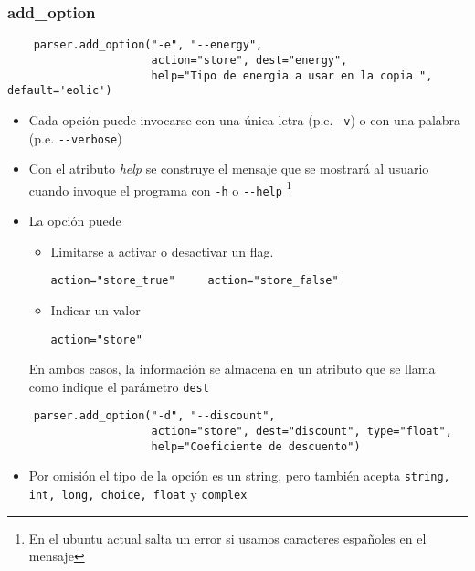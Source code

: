 \documentclass[ucs]{beamer}
\begin{document}
\begin{frame}[fragile]
\frametitle{add\_option}

  \begin{tiny}
  \begin{verbatim}
    parser.add_option("-e", "--energy", 
                      action="store", dest="energy",
                      help="Tipo de energia a usar en la copia ", default='eolic')
  \end{verbatim}
  \end{tiny}

\begin{itemize}
\item
Cada opción puede invocarse con una única letra (p.e. \verb|-v|) 
o con una palabra (p.e. \verb|--verbose|)
\item
Con el atributo \emph{help} se construye  el mensaje que
se mostrará al usuario cuando invoque el programa con  \verb|-h| o \verb|--help|
\footnote{En el ubuntu actual salta un error si usamos caracteres españoles
en el mensaje}
\item
La opción puede 

\begin{itemize}
\item
Limitarse a activar o desactivar un flag. 

\verb|action="store_true"     action="store_false"|
\item
Indicar un valor

\verb|action="store"|

\end{itemize}
En ambos casos, la información se almacena en un atributo que se llama
como indique el parámetro \verb|dest|
\end{itemize}

\end{frame}


\begin{frame}[fragile]

  \begin{tiny}
  \begin{verbatim}
    parser.add_option("-d", "--discount",
                      action="store", dest="discount", type="float",
                      help="Coeficiente de descuento")
  \end{verbatim}
  \end{tiny}
\begin{itemize}
\item
Por omisión el tipo de la opción es un string, pero también
acepta \verb|string, int, long, choice, float| y \verb|complex|
\end{itemize}

\end{frame}
\end{document}
